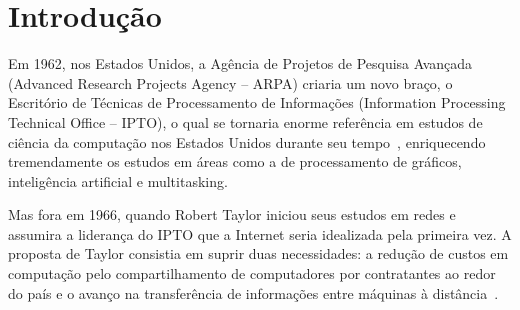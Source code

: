 \documentclass[conference]{IEEEtran}
\begin{document}

\section{Introdução}
  Em 1962, nos Estados Unidos, a Agência de Projetos de Pesquisa Avançada (Advanced Research Projects Agency -- ARPA) criaria um novo
  braço, o Escritório de Técnicas de Processamento de Informações (Information Processing Technical Office -- IPTO), o qual se
  tornaria enorme referência em estudos de ciência da computação nos Estados
  Unidos durante seu tempo~\cite{fromarpanet}, enriquecendo tremendamente os
  estudos em áreas como a de processamento de gráficos, inteligência artificial e
  multitasking.

  Mas fora em 1966, quando Robert Taylor iniciou seus estudos em redes e assumira a liderança do IPTO que a Internet seria idealizada pela primeira vez. A proposta de Taylor consistia em suprir duas necessidades: a redução de custos em computação pelo compartilhamento de computadores por contratantes ao redor do país e o avanço na transferência de informações entre máquinas à distância~\cite{fromarpanet}.
\end{document}
